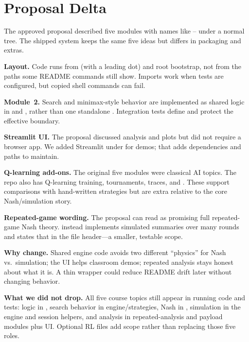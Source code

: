 \section{Proposal Delta}

The approved proposal described five modules with names like -- under a normal  tree. The shipped system keeps the same five ideas but differs in packaging and extras.

\textbf{Layout.} Code runs from  (with a leading dot) and root bootstrap, not from the  paths some README commands still show. Imports work when tests are configured, but copied shell commands can fail.

\textbf{Module~2.} Search and minimax-style behavior are implemented as shared logic in  and , rather than one standalone . Integration tests define and protect the effective boundary.

\textbf{Streamlit UI.} The proposal discussed analysis and plots but did not require a browser app. We added Streamlit under  for demos; that adds dependencies and paths to maintain.

\textbf{Q-learning add-ons.} The original five modules were classical AI topics. The repo also has Q-learning training, tournaments, traces, and . These support comparisons with hand-written strategies but are extra relative to the core Nash/simulation story.

\textbf{Repeated-game wording.} The proposal can read as promising full repeated-game Nash theory.  instead implements simulated summaries over many rounds and states that in the file header---a smaller, testable scope.

\textbf{Why change.} Shared engine code avoids two different ``physics'' for Nash vs.\ simulation; the UI helps classroom demos; repeated analysis stays honest about what it is. A thin  wrapper could reduce README drift later without changing behavior.

\textbf{What we did not drop.} All five course topics still appear in running code and tests: logic in , search behavior in engine/strategies, Nash in , simulation in the engine and session helpers, and analysis in repeated-analysis and payload modules plus UI. Optional RL files add scope rather than replacing those five roles.
